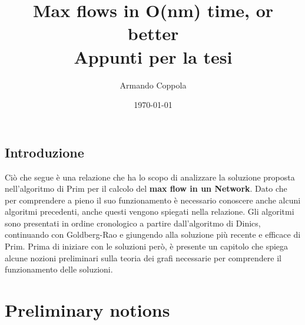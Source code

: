 \documentclass[a4paper, 11pt]{report}
\title{Max flows in O(nm) time, or better\\
\large Appunti per la tesi}
\author{Armando Coppola}
\date{\today}
\begin{document}
\maketitle
\newpage
\tableofcontents
\newpage
\section*{Introduzione}
Ciò che segue è una relazione che ha lo scopo di analizzare la soluzione proposta nell'algoritmo di Prim per il calcolo del \textbf{max flow in un Network}.
Dato che per comprendere a pieno il suo funzionamento è necessario conoscere anche alcuni algoritmi precedenti, anche questi vengono spiegati nella relazione. 
Gli algoritmi sono presentati in ordine cronologico a partire dall'algoritmo di Dinics, continuando con Goldberg-Rao e giungendo alla soluzione più recente e efficace di Prim.
Prima di iniziare con le soluzioni però, è presente un capitolo che spiega alcune nozioni preliminari sulla teoria dei grafi necessarie per comprendere il funzionamento delle soluzioni.

\chapter{Preliminary notions}
\end{document}
